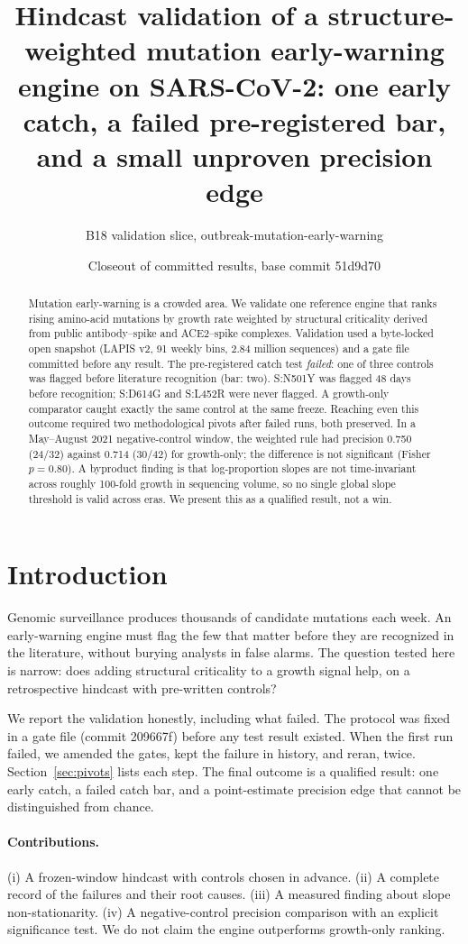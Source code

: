 \documentclass[11pt]{article}
\title{Hindcast validation of a structure-weighted mutation early-warning engine on SARS-CoV-2: one early catch, a failed pre-registered bar, and a small unproven precision edge}
\author{B18 validation slice, outbreak-mutation-early-warning}
\date{Closeout of committed results, base commit 51d9d70}
\begin{document}
\maketitle
\begin{abstract}
Mutation early-warning is a crowded area. We validate one reference engine that ranks rising amino-acid mutations by growth rate weighted by structural criticality derived from public antibody--spike and ACE2--spike complexes. Validation used a byte-locked open snapshot (LAPIS v2, 91 weekly bins, 2.84 million sequences) and a gate file committed before any result. The pre-registered catch test \emph{failed}: one of three controls was flagged before literature recognition (bar: two). S:N501Y was flagged 48 days before recognition; S:D614G and S:L452R were never flagged. A growth-only comparator caught exactly the same control at the same freeze. Reaching even this outcome required two methodological pivots after failed runs, both preserved. In a May--August 2021 negative-control window, the weighted rule had precision 0.750 (24/32) against 0.714 (30/42) for growth-only; the difference is not significant (Fisher $p=0.80$). A byproduct finding is that log-proportion slopes are not time-invariant across roughly 100-fold growth in sequencing volume, so no single global slope threshold is valid across eras. We present this as a qualified result, not a win.
\end{abstract}

\section{Introduction}
Genomic surveillance produces thousands of candidate mutations each week. An early-warning engine must flag the few that matter before they are recognized in the literature, without burying analysts in false alarms. The question tested here is narrow: does adding structural criticality to a growth signal help, on a retrospective hindcast with pre-written controls?

We report the validation honestly, including what failed. The protocol was fixed in a gate file (commit 209667f) before any test result existed. When the first run failed, we amended the gates, kept the failure in history, and reran, twice. Section~\ref{sec:pivots} lists each step. The final outcome is a qualified result: one early catch, a failed catch bar, and a point-estimate precision edge that cannot be distinguished from chance.

\paragraph{Contributions.} (i) A frozen-window hindcast with controls chosen in advance. (ii) A complete record of the failures and their root causes. (iii) A measured finding about slope non-stationarity. (iv) A negative-control precision comparison with an explicit significance test. We do not claim the engine outperforms growth-only ranking.
\end{document}
